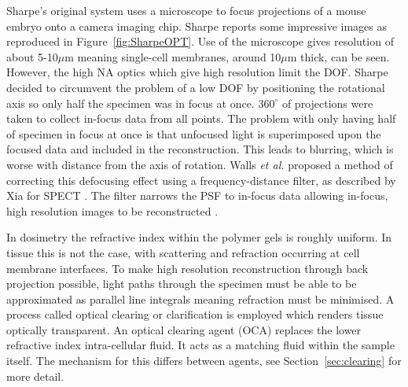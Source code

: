 \documentclass[12pt]{article}
\begin{document}
Sharpe's original system uses a microscope to focus projections of a mouse embryo onto a camera imaging chip.  Sharpe reports some impressive images as reproduced in Figure~\ref{fig:SharpeOPT}. Use of the microscope gives resolution of about 5-10$\mu$m meaning single-cell membranes, around 10$\mu$m thick, can be seen\cite{Sharpe:2002jp}. However, the high NA  optics which give high resolution limit the DOF. Sharpe decided to circumvent the problem of a low DOF by positioning the rotational axis so only half the specimen was in focus at once. $360^{\circ}$ of projections were taken to collect in-focus data from all points. The problem with only having half of specimen in focus at once is that unfocused light is superimposed upon the focused data and included in the reconstruction. This leads to blurring, which is worse with distance from the axis of rotation. Walls \textit{et al.} proposed a method of correcting this defocusing effect using a frequency-distance filter, as described by Xia for SPECT \cite{xia1995fourier,Walls:2007jl}. The filter narrows the PSF to in-focus data allowing in-focus, high resolution images to be reconstructed \cite{Walls:2007jl}.

	
	
In dosimetry the refractive index within the polymer gels is roughly uniform. In tissue this is not the case, with scattering and refraction occurring at cell membrane interfaces. To make high resolution reconstruction through back projection possible, light paths through the specimen must be able to  be approximated as parallel line integrals meaning refraction must be minimised. A process called optical clearing or clarification is employed which renders tissue optically transparent. An optical clearing agent (OCA) replaces the lower refractive index intra-cellular fluid. It acts as a matching fluid within the sample itself. The mechanism for this differs between agents, see Section~\ref{sec:clearing} for more detail. 
\end{document}

